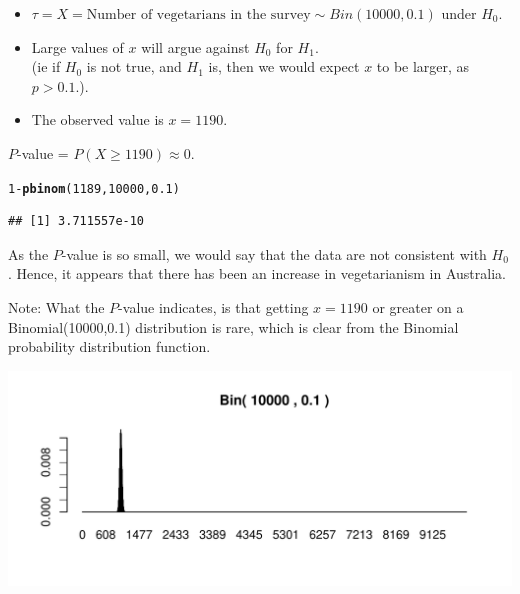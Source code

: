 \documentclass[t,xcolor=pdftex,dvipsnames,table]{beamer}
\makeatletter
\def\maxwidth{ %
  \ifdim\Gin@nat@width>\linewidth
    \linewidth
  \else
    \Gin@nat@width
  \fi
}
\newcommand{\hlnum}[1]{\textcolor[rgb]{0.686,0.059,0.569}{#1}}%
\newcommand{\hlopt}[1]{\textcolor[rgb]{0,0,0}{#1}}%
\newcommand{\hlstd}[1]{\textcolor[rgb]{0.345,0.345,0.345}{#1}}%
\newcommand{\hlkwd}[1]{\textcolor[rgb]{0.737,0.353,0.396}{\textbf{#1}}}%
\newenvironment{kframe}{%
 \def\at@end@of@kframe{}%
 \ifinner\ifhmode%
  \def\at@end@of@kframe{\end{minipage}}%
  \begin{minipage}{\columnwidth}%
 \fi\fi%
 \def\FrameCommand##1{\hskip\@totalleftmargin \hskip-\fboxsep
 \colorbox{shadecolor}{##1}\hskip-\fboxsep
     \hskip-\linewidth \hskip-\@totalleftmargin \hskip\columnwidth}%
 \MakeFramed {\advance\hsize-\width
   \@totalleftmargin\z@ \linewidth\hsize
   \@setminipage}}%
 {\par\unskip\endMakeFramed%
 \at@end@of@kframe}
\newenvironment{knitrout}{}{} %
\makeatother
\begin{document}
\begin{frame}[fragile]{}

\begin{itemize}
\item $\tau = X =  \mbox{Number of vegetarians in the survey} \sim Bin(10000,0.1)$ under $H_{0}$. 
\item Large values of $x$ will argue against $H_{0}$ for $H_{1}$. \\
(ie if $H_{0}$ is not true, and $H_{1}$ is, then we would expect $x$ to be larger, as $p > 0.1$.).
\item The observed value is $x=1190$.
\end{itemize}

\vspace{.5cm}
 $P$-value = $P( X \geq 1190) \approx 0$.

\begin{knitrout}
\color{fgcolor}\begin{kframe}
\begin{alltt}
\hlnum{1}\hlopt{-}\hlkwd{pbinom}\hlstd{(}\hlnum{1189}\hlstd{,}\hlnum{10000}\hlstd{,}\hlnum{0.1}\hlstd{)}
\end{alltt}
\begin{verbatim}
## [1] 3.711557e-10
\end{verbatim}
\end{kframe}
\end{knitrout}
\end{frame}

\begin{frame}[fragile]{}

As the $P$-value is so small, we would say that the data are not consistent with $H_{0}$. Hence, it appears that there has been an increase in vegetarianism in Australia.

\vspace{.5cm}
Note: What the $P$-value indicates, is that getting $x=1190$ or greater on a Binomial(10000,0.1) distribution is rare, which is clear from the Binomial probability distribution function.

\begin{knitrout}
\color{fgcolor}
\includegraphics[width=\maxwidth]{figure/unnamed-chunk-6-1} 

\end{knitrout}
\end{frame}
\end{document}
